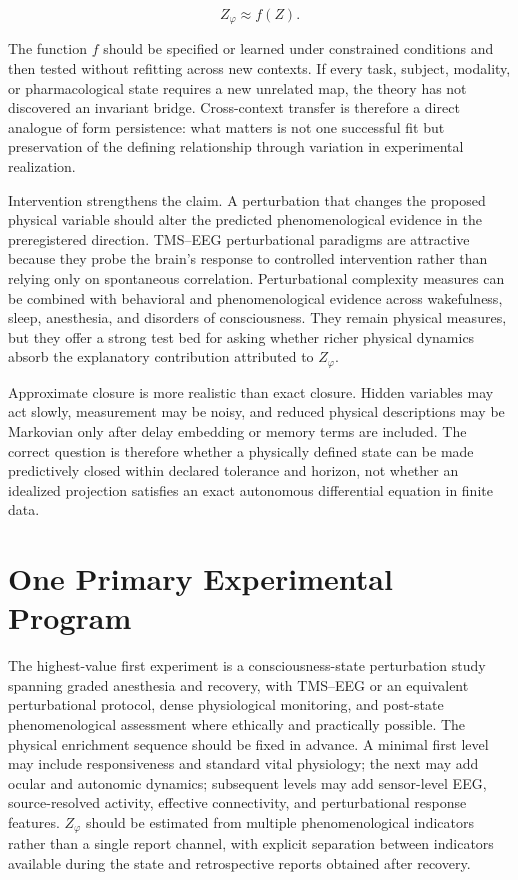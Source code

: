 \[
Z_\varphi\approx f(Z).
\]

The function $f$ should be specified or learned under constrained conditions and then tested without refitting across new contexts. If every task, subject, modality, or pharmacological state requires a new unrelated map, the theory has not discovered an invariant bridge. Cross-context transfer is therefore a direct analogue of form persistence: what matters is not one successful fit but preservation of the defining relationship through variation in experimental realization.

Intervention strengthens the claim. A perturbation that changes the proposed physical variable should alter the predicted phenomenological evidence in the preregistered direction. TMS--EEG perturbational paradigms are attractive because they probe the brain's response to controlled intervention rather than relying only on spontaneous correlation. Perturbational complexity measures can be combined with behavioral and phenomenological evidence across wakefulness, sleep, anesthesia, and disorders of consciousness. They remain physical measures, but they offer a strong test bed for asking whether richer physical dynamics absorb the explanatory contribution attributed to $Z_\varphi$.

Approximate closure is more realistic than exact closure. Hidden variables may act slowly, measurement may be noisy, and reduced physical descriptions may be Markovian only after delay embedding or memory terms are included. The correct question is therefore whether a physically defined state can be made predictively closed within declared tolerance and horizon, not whether an idealized projection satisfies an exact autonomous differential equation in finite data.

\section{One Primary Experimental Program}

The highest-value first experiment is a consciousness-state perturbation study spanning graded anesthesia and recovery, with TMS--EEG or an equivalent perturbational protocol, dense physiological monitoring, and post-state phenomenological assessment where ethically and practically possible. The physical enrichment sequence should be fixed in advance. A minimal first level may include responsiveness and standard vital physiology; the next may add ocular and autonomic dynamics; subsequent levels may add sensor-level EEG, source-resolved activity, effective connectivity, and perturbational response features. $Z_\varphi$ should be estimated from multiple phenomenological indicators rather than a single report channel, with explicit separation between indicators available during the state and retrospective reports obtained after recovery.

